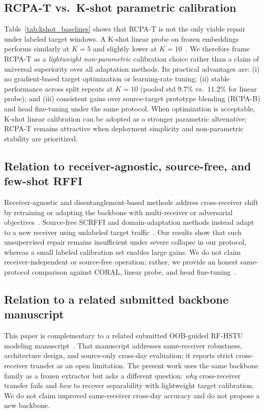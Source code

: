 \subsection{RCPA-T vs.\ K-shot parametric calibration}
Table~\ref{tab:kshot_baselines} shows that RCPA-T is not the only viable repair under labeled target windows.
A K-shot linear probe on frozen embeddings performs similarly at $K{=}5$ and slightly lower at $K{=}10$~\cite{snell2017prototypical,wen2016center_loss}.
We therefore frame RCPA-T as a \emph{lightweight non-parametric} calibration choice rather than a claim of universal superiority over all adaptation methods.
Its practical advantages are: (i) no gradient-based target optimization or learning-rate tuning; (ii) stable performance across split repeats at $K{=}10$ (pooled std $9.7\%$ vs.\ $11.2\%$ for linear probe); and (iii) consistent gains over source-target prototype blending (RCPA-B) and head fine-tuning under the same protocol.
When optimization is acceptable, K-shot linear calibration can be adopted as a stronger parametric alternative; RCPA-T remains attractive when deployment simplicity and non-parametric stability are prioritized.

\subsection{Relation to receiver-agnostic, source-free, and few-shot RFFI}
Receiver-agnostic and disentanglement-based methods address cross-receiver shift by retraining or adapting the backbone with multi-receiver or adversarial objectives~\cite{shen2024receiveragnostic,ma2025cross_receiver_disentangle,ma2025receiver_independent_rffi}.
Source-free SCRFFI and domain-adaptation methods instead adapt to a new receiver using unlabeled target traffic~\cite{yang2025scrffi,yang2024cross_receiver_da,liang2020shot,wang2021tent}.
Our results show that such unsupervised repair remains insufficient under severe collapse in our protocol, whereas a small labeled calibration set enables large gains.
We do not claim receiver-independent or source-free operation; rather, we provide an honest same-protocol comparison against CORAL, linear probe, and head fine-tuning~\cite{sun2016deepcoral,snell2017prototypical}.

\subsection{Relation to a related submitted backbone manuscript}
This paper is complementary to a related submitted OOB-guided RF-HSTU modeling manuscript~\cite{paper1_placeholder}.
That manuscript addresses same-receiver robustness, architecture design, and source-only cross-day evaluation; it reports strict cross-receiver transfer as an open limitation.
The present work uses the same backbone family as a frozen extractor but asks a different question: \emph{why} cross-receiver transfer fails and \emph{how} to recover separability with lightweight target calibration.
We do not claim improved same-receiver cross-day accuracy and do not propose a new backbone.

